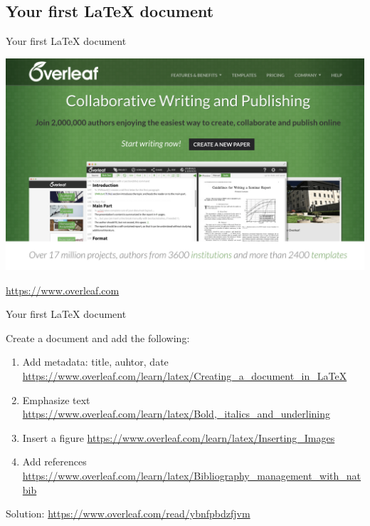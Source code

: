 \documentclass[inputenc]{beamer}
\begin{document}
\subsection{Your first \LaTeX{} document}

\begin{frame}{Your first \LaTeX{} document}
    
    \includegraphics[width=\textwidth]{overleaf_website.png}
    
    \centering
    \url{https://www.overleaf.com}
    
\end{frame}

\begin{frame}{Your first \LaTeX{} document}
    
    Create a document and add the following:
    \begin{enumerate}
        \item Add metadata: title, auhtor, date \url{https://www.overleaf.com/learn/latex/Creating\_a\_document\_in\_LaTeX}
        \item Emphasize text \url{https://www.overleaf.com/learn/latex/Bold,\_italics\_and\_underlining}
        \item Insert a figure \url{https://www.overleaf.com/learn/latex/Inserting\_Images}
        \item Add references \url{https://www.overleaf.com/learn/latex/Bibliography\_management\_with\_natbib}
    \end{enumerate}
    
    \vspace{0.5cm}
    Solution: \url{https://www.overleaf.com/read/ybnfpbdzfjvm}
    
\end{frame}
\end{document}
